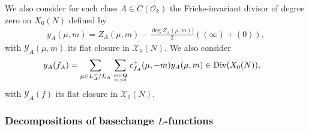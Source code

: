 \documentclass{amsart}
\theoremstyle{definition}
\theoremstyle{definition}
\theoremstyle{definition}
\begin{document}
We also consider for each class $A \in C(\mathcal{O}_k)$ the Fricke-invariant divisor of degree zero on $X_0(N)$ defined by
\begin{align*} y_A(\mu, m) = Z_A(\mu, m) - \frac{\deg Z_A(\mu, m))}{2} \left( (\infty) + (0) \right), \end{align*}
with $\mathcal{Y}_A(\mu, m)$ its flat closure in $\mathcal{X}_0(N)$. We also consider
\begin{align*} y_A(f_A) &= \sum\limits_{\mu \in L_A^{\vee}/L_A} \sum\limits_{m \in {\bf{Q}} \atop m >0} c_{f_A}^+(\mu, -m) 
y_A(\mu, m) \in \operatorname{Div}(X_0(N)),\end{align*}
with $\mathcal{Y}_A(f)$ its flat closure in $\mathcal{X}_0(N)$.

\subsubsection{Decompositions of basechange $L$-functions}
\end{document}
